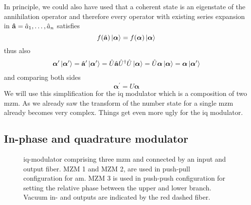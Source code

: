 In principle, we could also have used that a coherent state is an eigenstate of the annihilation operator and therefore every operator with existing series expansion in $\vb{\hat{a}}=\hat{a}_1,\dots,\hat{a}_n$ satisfies
\begin{equation}
	f(\hat{\vb{a}})
	\ket{\boldsymbol{\alpha}}
	=
	f(\boldsymbol{\alpha})
	\ket{\boldsymbol{\alpha}}
\end{equation}
thus also
\begin{equation}
	\begin{split}
		\boldsymbol{\alpha}^\prime
		\ket{\boldsymbol{\alpha}^\prime}
		=
		\hat{\vb{a}}^\prime
		\ket{\boldsymbol{\alpha}^\prime}
		=
		\hat{U}
		\hat{\vb{a}}
		\hat{U}^\dagger
		\hat{U}
		\ket{\boldsymbol{\alpha}}
		=
		\hat{U}
		\boldsymbol{\alpha}
		\ket{\boldsymbol{\alpha}}
		=
		\boldsymbol{\alpha}
		\ket{\boldsymbol{\alpha}^\prime}
	\end{split}
\end{equation}
and comparing both sides
\begin{equation}
	\boldsymbol{\alpha}^\prime
	=
	U
	\boldsymbol{\alpha}	
\end{equation}
We will use this simplification for the \gls{iq} modulator which is a composition of two \gls{mzm}.
As we already saw the transform of the number state for a single \gls{mzm} already becomes very complex.
Things get even more ugly for the \gls{iq} modulator.

\subsection{In-phase and quadrature modulator}

\begin{figure}[htb]
	\centering
	
	\caption{\gls{iq}-modulator comprising three \gls{mzm} and connected by an input and output fiber. MZM 1 and MZM 2, are used in push-pull configuration for \gls{am}. MZM 3 is used in push-push configuration for setting the relative phase between the upper and lower branch. Vacuum in- and outputs are indicated by the red dashed fiber.}
\end{figure}

